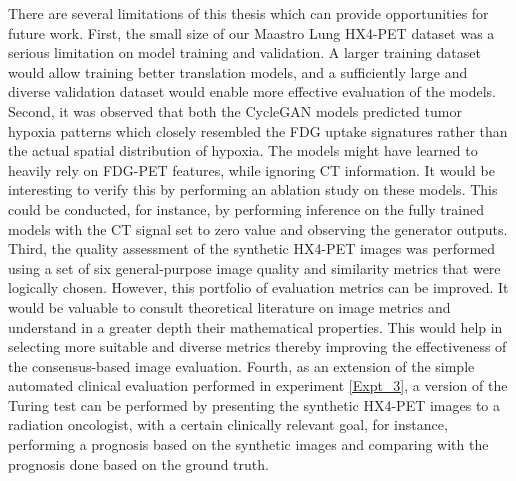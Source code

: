 There are several limitations of this thesis which can provide opportunities for future work. First, the small size of our Maastro Lung HX4-PET dataset was a serious limitation on model training and validation. A larger training dataset would allow training better translation models, and a sufficiently large and diverse validation dataset would enable more effective evaluation of the models. Second, it was observed that both the CycleGAN models predicted tumor hypoxia patterns which closely resembled the FDG uptake signatures rather than the actual spatial distribution of hypoxia. The models might have learned to heavily rely on FDG-PET features, while ignoring CT information. It would be interesting to verify this by performing an ablation study on these models. This could be conducted, for instance, by performing inference on the fully trained models with the CT signal set to zero value and observing the generator outputs. Third, the quality assessment of the synthetic HX4-PET images was performed using a set of six general-purpose image quality and similarity metrics that were logically chosen. However, this portfolio of evaluation metrics can be improved. It would be valuable to consult theoretical literature on image metrics and understand in a greater depth their mathematical properties. This would help in selecting more suitable and diverse metrics thereby improving the effectiveness of the consensus-based image evaluation. Fourth, as an extension of the simple automated clinical evaluation performed in experiment \ref{Expt_3}, a version of the Turing test can be performed by presenting the synthetic HX4-PET images to a radiation oncologist, with a certain clinically relevant goal, for instance, performing a prognosis based on the synthetic images and comparing with the prognosis done based on the ground truth.


